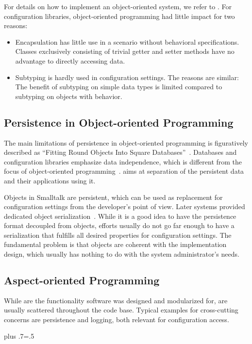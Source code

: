 For details on how to implement an object-oriented system, we refer to \citet{schwartzbach1994object}.
For configuration libraries, object-oriented programming had little impact for two reasons:
\begin{itemize}
\item
Encapsulation has little use in a scenario without behavioral specifications.
Classes exclusively consisting of trivial getter and setter methods have no advantage to directly accessing data.
\item
Subtyping is hardly used in configuration settings.
The reasons are similar:
The benefit of subtyping on simple data types is limited compared to subtyping on objects with behavior.
\end{itemize}

\subsection{Persistence in Object-oriented Programming}


The main limitations of persistence in object-oriented programming is figuratively described as \enquote{Fitting Round Objects Into Square Databases}~\cite{tsichritzis1988fitting}.
Databases and configuration libraries emphasize data independence, which is different from the focus of object-oriented programming~\cite{tsichritzis1988fitting}.
 aims at separation of the persistent data and their applications using it.

Objects in Smalltalk are persistent, which can be used as replacement for configuration settings from the developer's point of view.
Later systems provided dedicated object serialization~\cite{hericko2003object}.
While it is a good idea to have the persistence format decoupled from objects, efforts usually do not go far enough to have a serialization that fulfills all desired properties for configuration settings.
The fundamental problem is that objects are coherent with the implementation design, which usually has nothing to do with the system administrator's needs.

\subsection{Aspect-oriented Programming}

While  are the functionality software was designed and modularized for,  are usually scattered throughout the code base.
Typical examples for cross-cutting concerns are persistence and logging, both relevant for configuration access.%
{\parfillskip=0pt plus .7\textwidth \emergencystretch=.5\textwidth \par}


